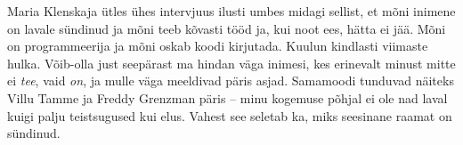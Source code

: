 Maria Klenskaja ütles ühes intervjuus ilusti umbes midagi sellist, et mõni inimene on lavale sündinud
ja mõni teeb kõvasti tööd ja, kui noot ees, hätta ei jää. Mõni on programmeerija ja 
mõni oskab koodi kirjutada. Kuulun kindlasti viimaste hulka. Võib-olla just 
seepärast ma hindan väga inimesi, kes erinevalt minust mitte ei \emph{tee}, vaid \emph{on}, ja mulle väga meeldivad päris asjad.
Samamoodi tunduvad näiteks Villu Tamme ja Freddy Grenzman päris -- minu kogemuse põhjal ei ole nad laval 
kuigi palju teistsugused kui elus. Vahest see seletab ka, miks 
seesinane raamat on sündinud.